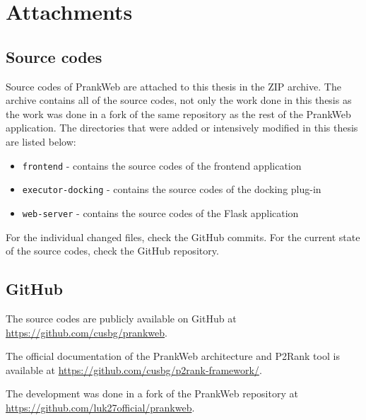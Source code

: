 \chapter{Attachments}

\section{Source codes}
\label{sec:source_codes}

Source codes of PrankWeb are attached to this thesis in the ZIP archive. The archive contains all of the source codes, not only the work done in this thesis as the work was done in a fork of the same repository as the rest of the PrankWeb application. The directories that were added or intensively modified in this thesis are listed below:
\begin{itemize}
    \item \texttt{frontend} - contains the source codes of the frontend application
    \item \texttt{executor-docking} - contains the source codes of the docking plug-in
    \item \texttt{web-server} - contains the source codes of the Flask application
\end{itemize}

For the individual changed files, check the GitHub commits. For the current state of the source codes, check the GitHub repository.

\section{GitHub}
\label{sec:github}

The source codes are publicly available on GitHub at \url{https://github.com/cusbg/prankweb}.

The official documentation of the PrankWeb architecture and P2Rank tool is available at \url{https://github.com/cusbg/p2rank-framework/}.

The development was done in a fork of the PrankWeb repository at \url{https://github.com/luk27official/prankweb}.

\pagebreak
